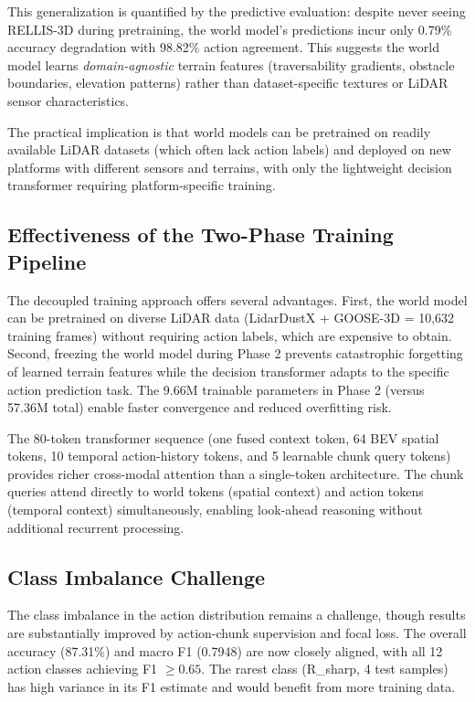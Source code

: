\documentclass[sensors,article,submit,pdftex,moreauthors]{Definitions/mdpi}
\begin{document}
This generalization is quantified by the predictive evaluation: despite never seeing RELLIS-3D during pretraining, the world model's predictions incur only 0.79\% accuracy degradation with 98.82\% action agreement. This suggests the world model learns \emph{domain-agnostic} terrain features (traversability gradients, obstacle boundaries, elevation patterns) rather than dataset-specific textures or LiDAR sensor characteristics.

The practical implication is that world models can be pretrained on readily available LiDAR datasets (which often lack action labels) and deployed on new platforms with different sensors and terrains, with only the lightweight decision transformer requiring platform-specific training.

\subsection{Effectiveness of the Two-Phase Training Pipeline}

The decoupled training approach offers several advantages. First, the world model can be pretrained on diverse LiDAR data (LidarDustX + GOOSE-3D = 10,632 training frames) without requiring action labels, which are expensive to obtain. Second, freezing the world model during Phase 2 prevents catastrophic forgetting of learned terrain features while the decision transformer adapts to the specific action prediction task. The 9.66M trainable parameters in Phase 2 (versus 57.36M total) enable faster convergence and reduced overfitting risk.

The 80-token transformer sequence (one fused context token, 64 BEV spatial tokens, 10 temporal action-history tokens, and 5 learnable chunk query tokens) provides richer cross-modal attention than a single-token architecture. The chunk queries attend directly to world tokens (spatial context) and action tokens (temporal context) simultaneously, enabling look-ahead reasoning without additional recurrent processing.

\subsection{Class Imbalance Challenge}

The class imbalance in the action distribution remains a challenge, though results are substantially improved by action-chunk supervision and focal loss. The overall accuracy (87.31\%) and macro F1 (0.7948) are now closely aligned, with all 12 action classes achieving F1 $\geq 0.65$. The rarest class (R\_sharp, 4 test samples) has high variance in its F1 estimate and would benefit from more training data.
\end{document}
